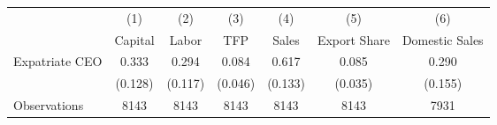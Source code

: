 \begin{tabular}{l*{6}{c}}
\hline\hline
                    &\multicolumn{1}{c}{(1)}&\multicolumn{1}{c}{(2)}&\multicolumn{1}{c}{(3)}&\multicolumn{1}{c}{(4)}&\multicolumn{1}{c}{(5)}&\multicolumn{1}{c}{(6)}\\
                    &\multicolumn{1}{c}{Capital}&\multicolumn{1}{c}{Labor}&\multicolumn{1}{c}{TFP}&\multicolumn{1}{c}{Sales}&\multicolumn{1}{c}{Export Share}&\multicolumn{1}{c}{Domestic Sales}\\
\hline
Expatriate CEO      &       0.333&       0.294&       0.084&       0.617&       0.085&       0.290\\
                    &     (0.128)&     (0.117)&     (0.046)&     (0.133)&     (0.035)&     (0.155)\\
\hline
Observations        &        8143&        8143&        8143&        8143&        8143&        7931\\
\hline\hline
\end{tabular}
